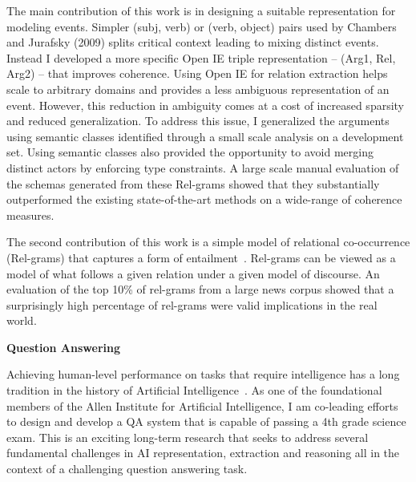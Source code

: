 \documentclass[a4paper,11pt,onecolumn]{article}
\begin{document}
The main contribution of this work is in designing a suitable representation for modeling events. Simpler (subj, verb) or (verb, object) pairs used by Chambers and Jurafsky (2009) splits critical context leading to mixing distinct events. Instead I developed a more specific Open IE triple representation -- (Arg1, Rel, Arg2) -- that improves coherence. Using Open IE for relation extraction helps scale to arbitrary domains and provides a less ambiguous representation of an event. However, this reduction in ambiguity comes at a cost of increased sparsity and reduced generalization. To address this issue, I generalized the arguments using semantic classes identified through a small scale analysis on a development set. Using semantic classes also provided the opportunity to avoid merging distinct actors by enforcing type constraints. 
A large scale manual evaluation of the schemas generated from these Rel-grams showed that they substantially outperformed the existing state-of-the-art methods on a wide-range of coherence measures.

The second contribution of this work is a simple model of relational co-occurrence (Rel-grams) that captures a form of entailment~\cite{balasubramanian-akbc12}. Rel-grams can be viewed as a model of what follows a given relation under a given model of discourse. An evaluation of the top 10\% of rel-grams from a large news corpus showed that a surprisingly high percentage of rel-grams were valid implications in the real world. 

{\bf Question Answering}

Achieving human-level performance on tasks that require intelligence has a long tradition in the history of Artificial Intelligence~\cite{}. As one of the foundational members of the Allen Institute for Artificial Intelligence, I am co-leading efforts to design and develop a QA system that is capable of passing a 4th grade science exam. This is an exciting long-term research that seeks to address several fundamental challenges in AI representation, extraction and reasoning all in the context of a challenging question answering task.
\end{document}
